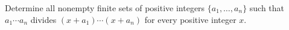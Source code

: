 Determine all nonempty finite sets of positive integers $\{a_1, \dots, a_n\}$ such that $a_1 \cdots a_n$ divides $(x + a_1) \cdots (x + a_n)$ for every positive integer $x$.

